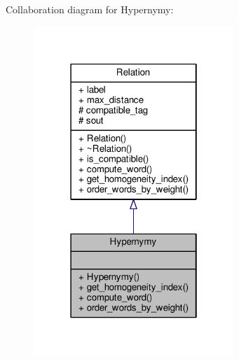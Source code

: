 Collaboration diagram for Hypernymy\+:
\nopagebreak
\begin{figure}[H]
\begin{center}
\leavevmode
\includegraphics[width=214pt]{classHypernymy__coll__graph}
\end{center}
\end{figure}
